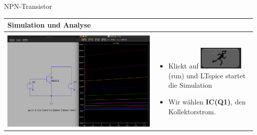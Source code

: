    \begin{frame}[t]{NPN-Transistor}
  
    \begin{spacing}{0.9} \begin{tiny}
    \begin{table}[h!]
      \begin{tabular}{p{5cm} p{5cm}}
        \hline
        \textbf{Simulation und Analyse} & \\
        \hline \\
        \begin{minipage}{.5\textwidth}
          \includegraphics[width=\linewidth]{pictures/analysis_4.png}
        \end{minipage} 
        & 
        \begin{minipage}{.5\textwidth}
        \begin{itemize}
          \item Klickt auf \includegraphics[scale=0.3]{pictures/run.png} (run) und LTspice startet die Simulation
        \item Wir wählen \textbf{IC(Q1)}, den Kollektorstrom.
        \end{itemize}
        \end{minipage} 
        \\
      \end{tabular}
    \end{table}
  \end{tiny} \end{spacing}
  

\end{frame}
